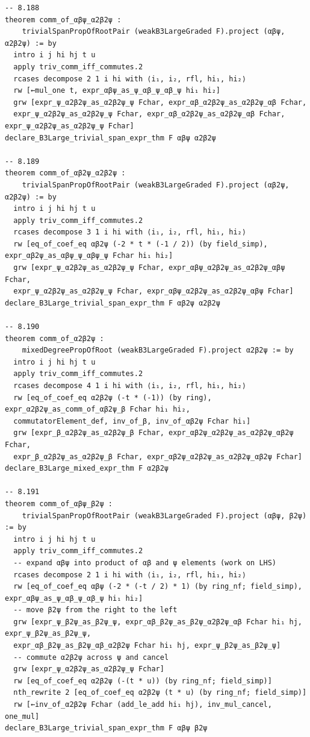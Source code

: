 \begin{Verbatim}
-- 8.188
theorem comm_of_αβψ_α2β2ψ :
    trivialSpanPropOfRootPair (weakB3LargeGraded F).project (αβψ, α2β2ψ) := by
  intro i j hi hj t u
  apply triv_comm_iff_commutes.2
  rcases decompose 2 1 i hi with ⟨i₁, i₂, rfl, hi₁, hi₂⟩
  rw [←mul_one t, expr_αβψ_as_ψ_αβ_ψ_αβ_ψ hi₁ hi₂]
  grw [expr_ψ_α2β2ψ_as_α2β2ψ_ψ Fchar, expr_αβ_α2β2ψ_as_α2β2ψ_αβ Fchar,
  expr_ψ_α2β2ψ_as_α2β2ψ_ψ Fchar, expr_αβ_α2β2ψ_as_α2β2ψ_αβ Fchar, expr_ψ_α2β2ψ_as_α2β2ψ_ψ Fchar]
declare_B3Large_trivial_span_expr_thm F αβψ α2β2ψ

-- 8.189
theorem comm_of_αβ2ψ_α2β2ψ :
    trivialSpanPropOfRootPair (weakB3LargeGraded F).project (αβ2ψ, α2β2ψ) := by
  intro i j hi hj t u
  apply triv_comm_iff_commutes.2
  rcases decompose 3 1 i hi with ⟨i₁, i₂, rfl, hi₁, hi₂⟩
  rw [eq_of_coef_eq αβ2ψ (-2 * t * (-1 / 2)) (by field_simp), expr_αβ2ψ_as_αβψ_ψ_αβψ_ψ Fchar hi₁ hi₂]
  grw [expr_ψ_α2β2ψ_as_α2β2ψ_ψ Fchar, expr_αβψ_α2β2ψ_as_α2β2ψ_αβψ Fchar,
  expr_ψ_α2β2ψ_as_α2β2ψ_ψ Fchar, expr_αβψ_α2β2ψ_as_α2β2ψ_αβψ Fchar]
declare_B3Large_trivial_span_expr_thm F αβ2ψ α2β2ψ

-- 8.190
theorem comm_of_α2β2ψ :
    mixedDegreePropOfRoot (weakB3LargeGraded F).project α2β2ψ := by
  intro i j hi hj t u
  apply triv_comm_iff_commutes.2
  rcases decompose 4 1 i hi with ⟨i₁, i₂, rfl, hi₁, hi₂⟩
  rw [eq_of_coef_eq α2β2ψ (-t * (-1)) (by ring), expr_α2β2ψ_as_comm_of_αβ2ψ_β Fchar hi₁ hi₂,
  commutatorElement_def, inv_of_β, inv_of_αβ2ψ Fchar hi₁]
  grw [expr_β_α2β2ψ_as_α2β2ψ_β Fchar, expr_αβ2ψ_α2β2ψ_as_α2β2ψ_αβ2ψ Fchar,
  expr_β_α2β2ψ_as_α2β2ψ_β Fchar, expr_αβ2ψ_α2β2ψ_as_α2β2ψ_αβ2ψ Fchar]
declare_B3Large_mixed_expr_thm F α2β2ψ

-- 8.191
theorem comm_of_αβψ_β2ψ :
    trivialSpanPropOfRootPair (weakB3LargeGraded F).project (αβψ, β2ψ) := by
  intro i j hi hj t u
  apply triv_comm_iff_commutes.2
  -- expand αβψ into product of αβ and ψ elements (work on LHS)
  rcases decompose 2 1 i hi with ⟨i₁, i₂, rfl, hi₁, hi₂⟩
  rw [eq_of_coef_eq αβψ (-2 * (-t / 2) * 1) (by ring_nf; field_simp), expr_αβψ_as_ψ_αβ_ψ_αβ_ψ hi₁ hi₂]
  -- move β2ψ from the right to the left
  grw [expr_ψ_β2ψ_as_β2ψ_ψ, expr_αβ_β2ψ_as_β2ψ_α2β2ψ_αβ Fchar hi₁ hj, expr_ψ_β2ψ_as_β2ψ_ψ,
  expr_αβ_β2ψ_as_β2ψ_αβ_α2β2ψ Fchar hi₁ hj, expr_ψ_β2ψ_as_β2ψ_ψ]
  -- commute α2β2ψ across ψ and cancel
  grw [expr_ψ_α2β2ψ_as_α2β2ψ_ψ Fchar]
  rw [eq_of_coef_eq α2β2ψ (-(t * u)) (by ring_nf; field_simp)]
  nth_rewrite 2 [eq_of_coef_eq α2β2ψ (t * u) (by ring_nf; field_simp)]
  rw [←inv_of_α2β2ψ Fchar (add_le_add hi₁ hj), inv_mul_cancel, one_mul]
declare_B3Large_trivial_span_expr_thm F αβψ β2ψ


\end{Verbatim}
